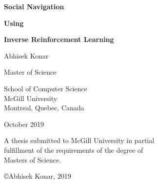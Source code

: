 \begin{titlepage}
\begin{center}

\vspace*{0.5cm}









{\sf\bfseries\LARGE  Social Navigation }

\vspace{0.15cm}

{\sf\bfseries\LARGE   Using}

\vspace{0.15cm}

{\sf\bfseries\LARGE  Inverse Reinforcement Learning}



\vspace{1.8cm}

{\large Abhisek Konar}

\vspace{1cm}

Master of Science


\vspace{1.4cm}

School of Computer Science\\
McGill University\\
Montreal, Quebec, Canada\\

\vspace{1.5cm}


October 2019


\vspace{1.4cm}


\noindent
A thesis submitted to McGill University in partial\\
fulfillment of the requirements of the degree of\\
Masters of Science.


\vspace{1.4cm}

{\small \copyright Abhisek Konar, 2019}


\end{center}
\end{titlepage}





